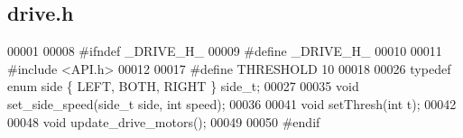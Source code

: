\subsection{drive.\+h}
\label{drive_8h_source}

\begin{DoxyCode}
00001 
00008 \textcolor{preprocessor}{#ifndef \_DRIVE\_H\_}
00009 \textcolor{preprocessor}{#define \_DRIVE\_H\_}
00010 
00011 \textcolor{preprocessor}{#include <API.h>}
00012 
00017 \textcolor{preprocessor}{#define THRESHOLD 10}
00018 
00026 \textcolor{keyword}{typedef} \textcolor{keyword}{enum} side \{ LEFT, BOTH, RIGHT \} side_t;
00027 
00035 \textcolor{keywordtype}{void} set_side_speed(side_t side, \textcolor{keywordtype}{int} speed);
00036 
00041 \textcolor{keywordtype}{void} setThresh(\textcolor{keywordtype}{int} t);
00042 
00048 \textcolor{keywordtype}{void} update_drive_motors();
00049 
00050 \textcolor{preprocessor}{#endif}
\end{DoxyCode}
